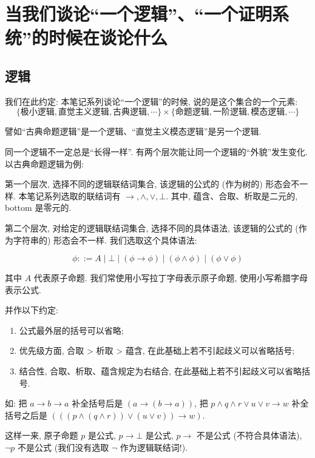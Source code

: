 \documentclass{article}
\begin{document}
\section{当我们谈论``一个逻辑''、``一个证明系统''的时候在谈论什么}

\subsection{逻辑}

我们在此约定: 本笔记系列谈论``一个逻辑''的时候, 说的是这个集合的一个元素:
$$
\{\text{极小逻辑}, \text{直觉主义逻辑}, \text{古典逻辑}, \cdots\} \times \{\text{命题逻辑}, \text{一阶逻辑}, \text{模态逻辑}, \cdots\}
$$

譬如``古典命题逻辑''是一个逻辑、``直觉主义模态逻辑''是另一个逻辑. 

同一个逻辑不一定总是``长得一样''. 有两个层次能让同一个逻辑的``外貌''发生变化. 以古典命题逻辑为例:

第一个层次, 选择不同的逻辑联结词集合, 该逻辑的公式的 (作为树的) 形态会不一样. 本笔记系列选取的联结词有 $\to,\land,\lor,\bot$. 其中, 蕴含、合取、析取是二元的, bottom 是零元的.

第二个层次, 对给定的逻辑联结词集合, 选择不同的具体语法, 该逻辑的公式的 (作为字符串的) 形态会不一样. 我们选取这个具体语法:

$$
\phi ::= A \mid \bot \mid (\phi \to \phi) \mid (\phi \land \phi) \mid (\phi \lor \phi)
$$ 

其中 $A$ 代表原子命题. 我们常使用小写拉丁字母表示原子命题, 使用小写希腊字母表示公式.

并作以下约定: 
\begin{enumerate}
\item 公式最外层的括号可以省略;
\item 优先级方面, 合取 > 析取 > 蕴含, 在此基础上若不引起歧义可以省略括号;
\item 结合性, 合取、析取、蕴含规定为右结合, 在此基础上若不引起歧义可以省略括号.
\end{enumerate}
如: 把 $a \to b \to a$ 补全括号后是 $(a \to (b \to a))$, 把 
$p \land q \land r \lor u \lor v \to w$ 补全括号之后是 
$(((p \land (q \land r)) \lor (u \lor v)) \to w)$.

这样一来, 原子命题 $p$ 是公式, $p \to \bot$ 是公式, $p \to$ 不是公式 (不符合具体语法), $\neg p$ 不是公式 (我们没有选取 $\neg$ 作为逻辑联结词!).
\end{document}

